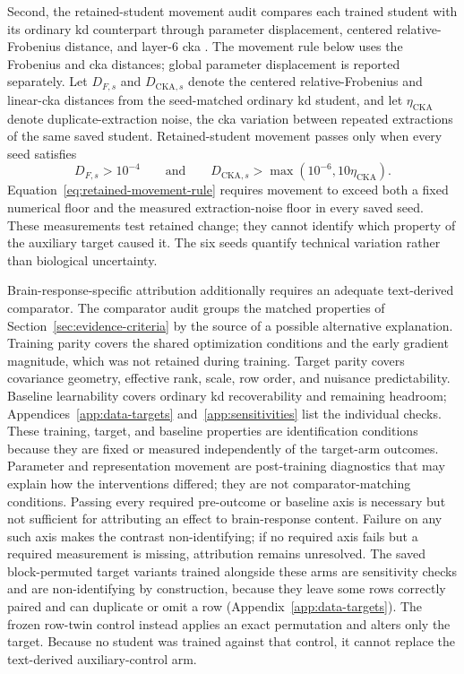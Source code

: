 Second, the retained-student movement audit compares each trained student with its ordinary \ac{kd} counterpart through parameter displacement, centered relative-Frobenius distance, and layer-6 \ac{cka} \autocite{kornblith2019}.
The movement rule below uses the Frobenius and \ac{cka} distances; global parameter displacement is reported separately.
Let \(D_{F,s}\) and \(D_{\mathrm{CKA},s}\) denote the centered relative-Frobenius and linear-\ac{cka} distances from the seed-matched ordinary \ac{kd} student, and let \(\eta_{\mathrm{CKA}}\) denote duplicate-extraction noise, the \ac{cka} variation between repeated extractions of the same saved student.
Retained-student movement passes only when every seed satisfies
\begin{equation}
D_{F,s} > 10^{-4} %
\qquad\text{and}\qquad
D_{\mathrm{CKA},s} > \max\!\left(10^{-6}, 10\eta_{\mathrm{CKA}}\right). %
\label{eq:retained-movement-rule}
\end{equation}
Equation~\ref{eq:retained-movement-rule} requires movement to exceed both a fixed numerical floor and the measured extraction-noise floor in every saved seed.
These measurements test retained change; they cannot identify which property of the auxiliary target caused it.
 The six seeds quantify technical variation rather than biological uncertainty.

Brain-response-specific attribution additionally requires an adequate text-derived comparator.
The comparator audit groups the matched properties of Section~\ref{sec:evidence-criteria} by the source of a possible alternative explanation.
Training parity covers the shared optimization conditions and the early gradient magnitude, which was not retained during training.
Target parity covers covariance geometry, effective rank, scale, row order, and nuisance predictability.
Baseline learnability covers ordinary \ac{kd} recoverability and remaining headroom; Appendices~\ref{app:data-targets} and~\ref{app:sensitivities} list the individual checks.
These training, target, and baseline properties are identification conditions because they are fixed or measured independently of the target-arm outcomes.
Parameter and representation movement are post-training diagnostics that may explain how the interventions differed; they are not comparator-matching conditions.
Passing every required pre-outcome or baseline axis is necessary but not sufficient for attributing an effect to brain-response content.
Failure on any such axis makes the contrast non-identifying; if no required axis fails but a required measurement is missing, attribution remains unresolved.
The saved block-permuted target variants trained alongside these arms are sensitivity checks and are non-identifying by construction, because they leave some rows correctly paired and can duplicate or omit a row (Appendix~\ref{app:data-targets}).
The frozen row-twin control instead applies an exact permutation and alters only the target.
Because no student was trained against that control, it cannot replace the text-derived auxiliary-control arm.

